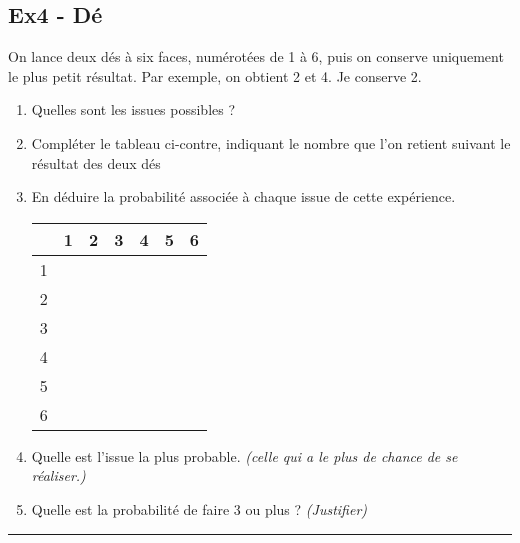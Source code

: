 \documentclass[11pt]{article}
\newcommand{\horrule}[1]{\rule{\linewidth}{#1}} %
\begin{document}
\begin{multicols}{2}
  \subsection*{Ex4 - Dé}

  On lance deux dés à six faces, numérotées de 1 à 6, puis on conserve uniquement le plus petit résultat. Par exemple, on obtient 2 et 4. Je conserve 2.

  \begin{enumerate}
  \item Quelles sont les issues possibles ?
  \item Compléter le tableau ci-contre, indiquant le nombre que l’on retient suivant le résultat des deux dés
  \item En déduire la probabilité associée à chaque issue de cette expérience. 
    \begin{center}
      \begin{tabular}{|c|c|c|c|c|c|c|}
        \hline
        & 1 & 2 & 3 & 4 & 5 & 6 \\
        \hline
        1 &   &   &   &   &   &\\  
        \hline
        2 &   &   &   &   &   &\\  
        \hline
        3 &   &   &   &   &   &\\  
        \hline
        4 &   &   &   &   &   &\\  
        \hline
        5 &   &   &   &   &   &\\  
        \hline
        6 &   &   &   &   &   &\\
        \hline     
      \end{tabular}
    \end{center}
  \item Quelle est l'issue la plus probable. \textit{(celle qui a le plus de chance de se réaliser.)}
  \item Quelle est la probabilité de faire 3 ou plus ?  \textit{(Justifier)}
  \end{enumerate}
\end{multicols}

\vspace{-0.4cm}
\horrule{1px}
\vspace{-0.8cm}
\end{document}
